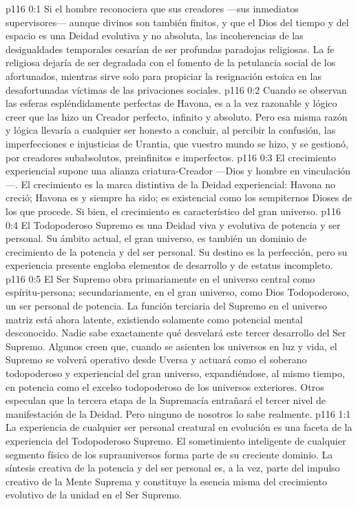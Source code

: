 \author{Mensajero poderoso}
\vs p116 0:1 Si el hombre reconociera que sus creadores ---sus inmediatos supervisores--- aunque divinos son también finitos, y que el Dios del tiempo y del espacio es una Deidad evolutiva y no absoluta, las incoherencias de las desigualdades temporales cesarían de ser profundas paradojas religiosas. La fe religiosa dejaría de ser degradada con el fomento de la petulancia social de los afortunados, mientras sirve solo para propiciar la resignación estoica en las desafortunadas víctimas de las privaciones sociales.
\vs p116 0:2 Cuando se observan las esferas espléndidamente perfectas de Havona, es a la vez razonable y lógico creer que las hizo un Creador perfecto, infinito y absoluto. Pero esa misma razón y lógica llevaría a cualquier ser honesto a concluir, al percibir la confusión, las imperfecciones e injusticias de Urantia, que vuestro mundo se hizo, y se gestionó, por creadores subabsolutos, preinfinitos e imperfectos.
\vs p116 0:3 \pc El crecimiento experiencial supone una alianza criatura\hyp{}Creador ---Dios y hombre en vinculación---. El crecimiento es la marca distintiva de la Deidad experiencial: Havona no creció; Havona es y siempre ha sido; es existencial como los sempiternos Dioses de los que procede. Si bien, el crecimiento es característico del gran universo.
\vs p116 0:4 El Todopoderoso Supremo es una Deidad viva y evolutiva de potencia y ser personal. Su ámbito actual, el gran universo, es también un dominio de crecimiento de la potencia y del ser personal. Su destino es la perfección, pero su experiencia presente engloba elementos de desarrollo y de estatus incompleto.
\vs p116 0:5 \pc El Ser Supremo obra primariamente en el universo central como espíritu\hyp{}persona; secundariamente, en el gran universo, como Dios Todopoderoso, un ser personal de potencia. La función terciaria del Supremo en el universo matriz está ahora latente, existiendo solamente como potencial mental desconocido. Nadie sabe exactamente qué desvelará este tercer desarrollo del Ser Supremo. Algunos creen que, cuando se asienten los universos en luz y vida, el Supremo se volverá operativo desde Uversa y actuará como el soberano todopoderoso y experiencial del gran universo, expandiéndose, al mismo tiempo, en potencia como el excelso todopoderoso de los universos exteriores. Otros especulan que la tercera etapa de la Supremacía entrañará el tercer nivel de manifestación de la Deidad. Pero ninguno de nosotros lo sabe realmente.
\vs p116 1:1 La experiencia de cualquier ser personal creatural en evolución es una faceta de la experiencia del Todopoderoso Supremo. El sometimiento inteligente de cualquier segmento físico de los suprauniversos forma parte de su creciente dominio. La síntesis creativa de la potencia y del ser personal es, a la vez, parte del impulso creativo de la Mente Suprema y constituye la esencia misma del crecimiento evolutivo de la unidad en el Ser Supremo.
